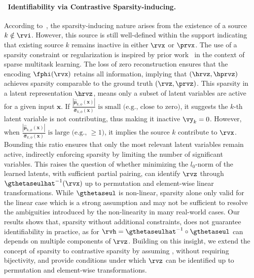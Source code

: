 \documentclass{article} %
\theoremstyle{plain}
\theoremstyle{definition}
\theoremstyle{remark}
\numberwithin{equation}{section}
\begin{document}
\paragraph{\ Identifiability via Contrastive Sparsity-inducing.}
According to~, the sparsity-inducing nature arises from the existence of a source $k \notin \rvi$. However, this source is still well-defined within the support indicating that existing source $k$ remains inactive in either $\rvx$ or $\prvx$. The use of a sparsity constraint or regularization is inspired by prior work~\citep{ahuja_interventional_2023, lachapelle2023synergies} in the context of sparse multitask learning. The loss of zero reconstruction ensures that the encoding \( \fphi(\rvx) \) retains all information, implying that \( (\hrvz, \hprvz) \) achieves sparsity comparable to the ground truth \( (\rvz, \prvz) \). This sparsity in a latent representation \( \hrvz \), means only a subset of latent variables are active for a given input \(\mathbf{x}\). If  $\frac{\left|\hat{\boldsymbol\mu}_{k,\phi}(\mathbf{x})\right|}{\hat{\boldsymbol\sigma}_{k,\phi}(\mathbf{x})}  \text{ is small (e.g., close to zero)}$, it suggests the \(k\)-th latent variable is not contributing, thus making it inactive $\vy_k=0$. However, when $\frac{\left|\hat{\boldsymbol\mu}_{k,\phi}(\mathbf{x})\right|}{\hat{\boldsymbol\sigma}_{k,\phi}(\mathbf{x})}  \text{ is large (e.g., }\geq 1\text{)}$, it implies the source $k$ contribute to $\rvx$. Bounding this ratio ensures that only the most relevant latent variables remain active, indirectly enforcing sparsity by limiting the number of significant variables. This raises the question of whether minimizing the \( l_0 \)-norm of the learned latents, with sufficient partial pairing, can identify \( \rvz \) through \( \gthetaseulhat^{-1}(\rvx) \) up to permutation and element-wise linear transformations. While \( \gthetaseul \) is non-linear, sparsity alone only valid for the linear case \citep{lachapelle2022disentanglement} which is a strong assumption and may not be sufficient to resolve the ambiguities introduced by the non-linearity in many real-world cases. Our results shows that, sparsity without additional constraints, does not guarantee identifiability in practice, as for  \( \rvh = \gthetaseulhat^{-1} \circ \gthetaseul \) can depends on multiple components of \( \rvz \). Building on this insight, we extend the concept of sparsity to contrastive sparsity by assuming , without requiring bijectivity, and provide conditions under which \( \rvz \) can be identified up to permutation and element-wise transformations.
\end{document}
